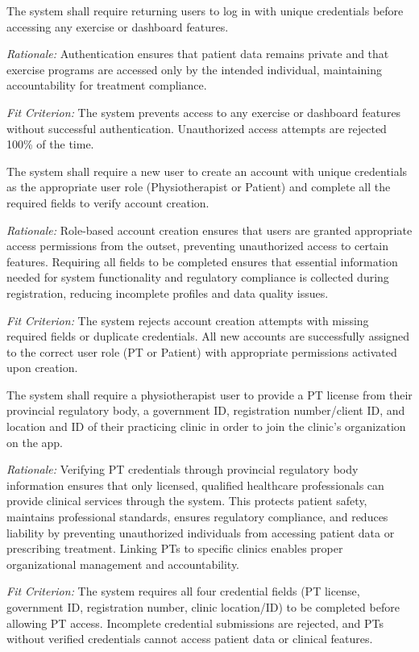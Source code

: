 \documentclass[12pt]{article}
\newcommand{\rationale}[1]{\par\emph{Rationale:} #1}
\newcommand{\fitcrit}[1]{\par\emph{Fit Criterion:} #1}
\begin{document}
\begin{reqlist}
	
	\item[FR 1.] The system shall require returning users to log in with unique credentials before accessing any exercise or dashboard features.
	\rationale{Authentication ensures that patient data remains private and that exercise programs are accessed only by the intended individual, maintaining accountability for treatment compliance.}
	\fitcrit{The system prevents access to any exercise or dashboard features without successful authentication. Unauthorized access attempts are rejected 100\% of the time.}
	
	\item[FR 1.1] The system shall require a new user to create an account with unique credentials as the appropriate user role (Physiotherapist or Patient) and complete all the required fields to verify account creation.
	\rationale{Role-based account creation ensures that users are granted appropriate access permissions from the outset, preventing unauthorized access to certain features. Requiring all fields to be completed ensures that essential information needed for system functionality and regulatory compliance is collected during registration, reducing incomplete profiles and data quality issues.}
	\fitcrit{The system rejects account creation attempts with missing required fields or duplicate credentials. All new accounts are successfully assigned to the correct user role (PT or Patient) with appropriate permissions activated upon creation.}
	
	\item[FR 1.2] The system shall require a physiotherapist user to provide a PT license from their provincial regulatory body, a government ID, registration number/client ID, and location and ID of their practicing clinic in order to join the clinic’s organization on the app.
	\rationale{Verifying PT credentials through provincial regulatory body information ensures that only licensed, qualified healthcare professionals can provide clinical services through the system. This protects patient safety, maintains professional standards, ensures regulatory compliance, and reduces liability by preventing unauthorized individuals from accessing patient data or prescribing treatment. Linking PTs to specific clinics enables proper organizational management and accountability.}
	\fitcrit{The system requires all four credential fields (PT license, government ID, registration number, clinic location/ID) to be completed before allowing PT access. Incomplete credential submissions are rejected, and PTs without verified credentials cannot access patient data or clinical features.}
	

\end{reqlist}
\end{document}

